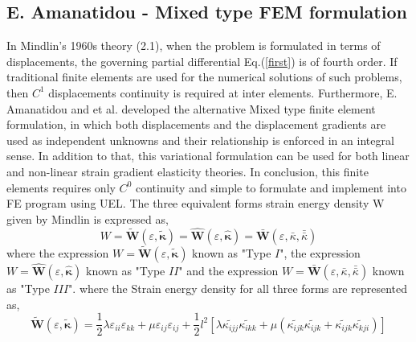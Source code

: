 \documentclass[12pt]{article}
\begin{document}
\subsection{E. Amanatidou - Mixed type FEM formulation}
In Mindlin's 1960s theory (2.1), when the problem is formulated in terms of displacements, the governing partial differential Eq.(\ref{first}) is of fourth order. If traditional finite elements are used for the numerical solutions of such problems, then $C^1$ displacements continuity is required at inter elements.
\newline
\newline
Furthermore, E. Amanatidou and et al. developed the alternative Mixed type finite element formulation, in which both displacements and the displacement gradients are used as independent unknowns and their relationship is enforced in an integral sense. In addition to that, this variational formulation can be used for both linear and non-linear strain gradient elasticity theories. In conclusion, this finite elements requires only $C^0$ continuity and simple to formulate and implement into FE program using UEL.   
\newline
\newline
The three equivalent forms strain energy density W given by Mindlin is expressed as,
\begin{equation}
W = \tilde{\mathbf{W}}(\varepsilon,\tilde{\mathbf{\kappa}}) = \hat{\mathbf{W}}(\varepsilon,\hat{\mathbf{\kappa}}) = \bar{\mathbf{W}}(\varepsilon,\bar{\kappa},\bar{\bar \kappa})
\end{equation}
\newline
where the expression $W = \tilde{\mathbf{W}}(\varepsilon,\tilde{\mathbf{\kappa}})$ known as "Type $I$", the expression $W =\hat{\mathbf{W}}(\varepsilon,\hat{\mathbf{\kappa}}) $ known as "Type $II$" and the expression $W = \bar{\mathbf{W}}(\varepsilon,\bar{\kappa},\bar{\bar \kappa}) $ known as "Type $III$".
\newline
\newline
where the Strain energy density for all three forms are represented as,
\newline
\newline
\begin{equation}\label{eleven}
\tilde{\mathbf{W}}(\varepsilon,\tilde{\mathbf{\kappa}}) = \dfrac{1}{2}\lambda\varepsilon_{ii}\varepsilon_{kk} + \mu\varepsilon_{ij}\varepsilon_{ij}+\frac{1}{2}l^2[\lambda\tilde{\kappa_{ijj}}\tilde{\kappa_{ikk}} + \mu(\tilde{\kappa_{ijk}}\tilde{\kappa_{ijk}}+\tilde{\kappa_{ijk}}\tilde{\kappa_{kji}})]
\end{equation}
\end{document}
